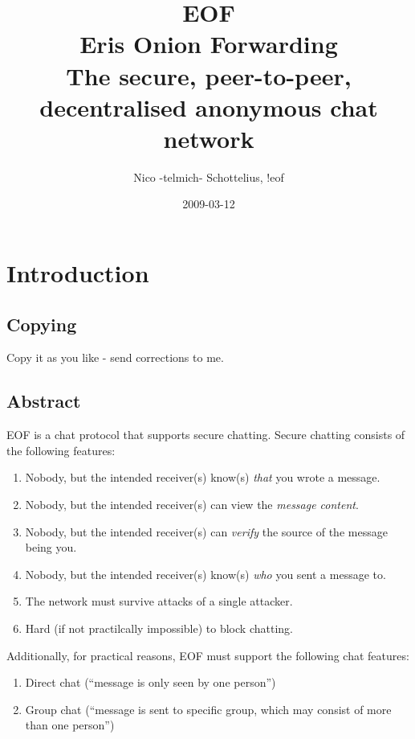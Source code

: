 \documentclass[12pt,a4paper]{book}
\begin{document}
\title{EOF\\Eris Onion Forwarding\\
The secure, peer-to-peer, decentralised anonymous chat network}
\date{2009-03-12}
\author{Nico -telmich- Schottelius, !eof}

\maketitle
\tableofcontents

\chapter{Introduction}
\section{Copying}
Copy it as you like - send corrections to me.
\section{Abstract}
EOF is a chat protocol that supports secure chatting.
Secure chatting consists of the following features:
\begin{enumerate}
\item Nobody, but the intended receiver(s) know(s) \emph{that} you wrote a message.
\item Nobody, but the intended receiver(s) can view the \emph{message content}.
\item Nobody, but the intended receiver(s) can \emph{verify} the source of the message being you.
\item Nobody, but the intended receiver(s) know(s) \emph{who} you sent a message to.
\item The network must survive attacks of a single attacker.
\item Hard (if not practilcally impossible) to block chatting.
\end{enumerate}
Additionally, for practical reasons, EOF must support the following
chat features:
\begin{enumerate}
\item Direct chat ("`message is only seen by one person"')
\item Group chat ("`message is sent to specific group, which may consist of
more than one person"')
\end{enumerate}
\end{document}
